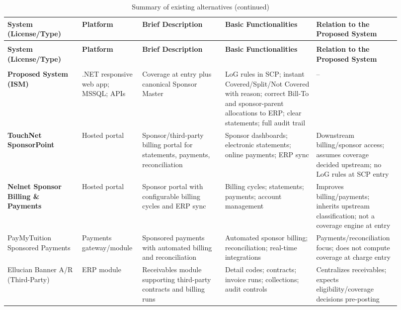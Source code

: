 \begin{longtable}{>{\raggedright\arraybackslash}p{0.18\linewidth}
>{\raggedright\arraybackslash}p{0.14\linewidth}
>{\raggedright\arraybackslash}p{0.20\linewidth}
>{\raggedright\arraybackslash}p{0.22\linewidth}
>{\raggedright\arraybackslash}p{0.18\linewidth}}
\caption{Summary of existing alternatives}\label{table:existing-alternatives-summary}\\
\toprule
\textbf{System (License/Type)} & \textbf{Platform} & \textbf{Brief Description} & \textbf{Basic Functionalities} & \textbf{Relation to the Proposed System} \\
\midrule
\endfirsthead
\caption[]{Summary of existing alternatives (continued)}\\
\toprule
\textbf{System (License/Type)} & \textbf{Platform} & \textbf{Brief Description} & \textbf{Basic Functionalities} & \textbf{Relation to the Proposed System} \\
\midrule
\endhead
\midrule
\multicolumn{5}{r}{\textit{Continued on next page}}\\
\endfoot
\bottomrule
\endlastfoot
\textbf{Proposed System (ISM)} & .NET responsive web app; MSSQL; APIs & Coverage at entry plus canonical Sponsor Master & LoG rules in SCP; instant Covered/Split/Not Covered with reason; correct Bill-To and sponsor-parent allocations to ERP; clear statements; full audit trail & -- \\
\textbf{TouchNet SponsorPoint}\tnote{d} & Hosted portal & Sponsor/third-party billing portal for statements, payments, reconciliation & Sponsor dashboards; electronic statements; online payments; ERP sync & Downstream billing/sponsor access; assumes coverage decided upstream; no LoG rules at SCP entry \\
\textbf{Nelnet Sponsor Billing \& Payments}\tnote{e} & Hosted portal & Sponsor portal with configurable billing cycles and ERP sync & Billing cycles; statements; payments; account management & Improves billing/payments; inherits upstream classification; not a coverage engine at entry \\
PayMyTuition Sponsored Payments\tnote{f} & Payments gateway/module & Sponsored payments with automated billing and reconciliation & Automated sponsor billing; reconciliation; real-time integrations & Payments/reconciliation focus; does not compute coverage at charge entry \\
Ellucian Banner A/R (Third-Party)\tnote{a,c} & ERP module & Receivables module supporting third-party contracts and billing runs & Detail codes; contracts; invoice runs; collections; audit controls & Centralizes receivables; expects eligibility/coverage decisions pre-posting \\
\end{longtable}

